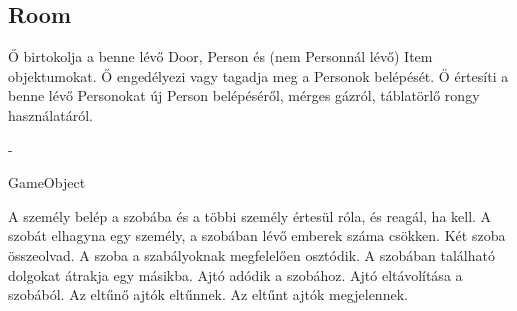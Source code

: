 \subsection{Room}
\begin{class-template-responsibility}
    Ő birtokolja a benne lévő Door, Person és (nem Personnál lévő) Item objektumokat.
    Ő engedélyezi vagy tagadja meg a Personok belépését.
    Ő értesíti a benne lévő Personokat új Person belépéséről, mérges gázról, táblatörlő rongy használatáról. 
\end{class-template-responsibility}
\begin{class-template-interface}
    -
\end{class-template-interface}
\begin{class-template-baseclass}
    GameObject
\end{class-template-baseclass}
\begin{class-template-attribute}
\end{class-template-attribute}
\begin{class-template-method}
     { A személy belép a szobába és a többi személy értesül róla, és reagál, ha kell.}
     { A szobát elhagyna egy személy, a szobában lévő emberek száma csökken.}
     { Két szoba összeolvad.}
     {A szoba a szabályoknak megfelelően osztódik.}
     {A szobában található dolgokat átrakja egy másikba.}
     {Ajtó adódik a szobához.}
     {Ajtó eltávolítása a szobából.}
     {Az eltűnő ajtók eltűnnek.}
     {Az eltűnt ajtók megjelennek.}
\end{class-template-method}

